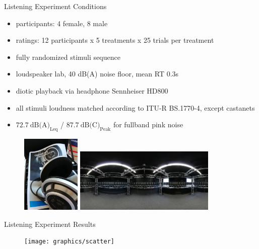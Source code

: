 \documentclass[mathserif]{intbeamer}
\begin{document}
\begin{frame}{Listening Experiment Conditions}
\begin{itemize}
\item participants: 4 female, 8 male
\item ratings: 12 participants x 5 treatments x 25 trials per treatment
\item fully randomized stimuli sequence
\item loudspeaker lab, 40 dB(A) noise floor, mean RT 0.3s
\item diotic playback via \textcolor{colzerotalk}{headphone} Sennheiser HD800
\item all stimuli loudness matched according to ITU-R BS.1770-4, except castanets
\item $72.7~\text{dB(A)}_\text{Leq}$ / $87.7~\text{dB(C)}_\text{Peak}$
for fullband pink noise
\end{itemize}
\begin{figure}
\includegraphics[width=0.25\textwidth]{graphics/HD800}
\includegraphics[width=0.6\textwidth]{graphics/URO_array_panorama}
\end{figure}

\end{frame}
%
%
%
\begin{frame}{Listening Experiment Results}
\begin{figure}
\texttt{[image: graphics/scatter]}
\end{figure}
\end{frame}
%
%
%
\end{document}
